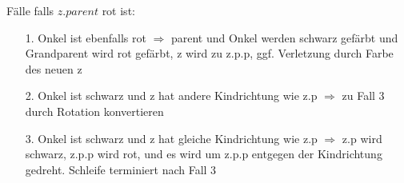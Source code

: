 \documentclass[
    ngerman,
    color=3b,
    dark_mode,
    load_common, %
    summary,
    boxarc,
]{tuda_summary}
\begin{document}
Fälle falls $z.parent$ rot ist:\\
\begin{minipage}{.5\textwidth-1.85301pt}
    \begin{itemize}
        \item[1.] Onkel ist ebenfalls rot $\Rightarrow$ parent und Onkel werden schwarz gefärbt und Grandparent wird rot gefärbt, z wird zu z.p.p, ggf. Verletzung durch Farbe des neuen z
        \item[2.] Onkel ist schwarz und z hat andere Kindrichtung wie z.p $\Rightarrow$ zu Fall 3 durch Rotation konvertieren
        \item[3.] Onkel ist schwarz und z hat gleiche Kindrichtung wie z.p $\Rightarrow$ z.p wird schwarz, z.p.p wird rot, und es wird um z.p.p entgegen der Kindrichtung gedreht. Schleife terminiert nach Fall 3
    \end{itemize}
\end{minipage}
\begin{minipage}{.5\textwidth}
    \begin{tcolorbox}[
            colback=yellow!20,
            colframe=black!70,
            enhanced,
            title={Fall 1},
            fonttitle=\sffamily\bfseries,
            center title,
            every float=\centering
        ]
        \centering
        
    \end{tcolorbox}
\end{minipage}\\
\begin{minipage}[t]{.5\textwidth}\mbox{}
    \begin{tcolorbox}[
            colback=yellow!20,
            colframe=black!70,
            enhanced,
            title={Fall 2},
            fonttitle=\sffamily\bfseries,
            center title,
            every float=\centering
        ]
        \centering
        
    \end{tcolorbox}
\end{minipage}
\begin{minipage}[t]{.5\textwidth-1.85301pt}\mbox{}
    \begin{tcolorbox}[
            colback=yellow!20,
            colframe=black!70,
            enhanced,
            title={Fall 3},
            fonttitle=\sffamily\bfseries,
            center title,
            every float=\centering,
        ]
        \centering
        
    \end{tcolorbox}
\end{minipage}
\end{document}
